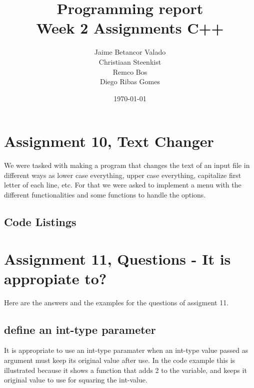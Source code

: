 \documentclass[a4paper]{article}
\begin{document}
\title{Programming report \\
       Week 2 Assignments C++
}
\date{\today}
\author{Jaime Betancor Valado \\
Christiaan Steenkist \\
Remco Bos \\
Diego Ribas Gomes
}

\maketitle

\section*{Assignment 10, Text Changer}
We were tasked with making a program that changes the text of an input file in different ways as lower case everything, upper case everything, capitalize first letter of each line, etc. For that we were asked to implement a menu with the different functionalities and some functions to handle the options.

\subsection*{Code Listings}









\section*{Assignment 11, Questions - It is appropiate to?}
Here are the answers and the examples for the questions of assigment 11.

\subsection*{define an int-type parameter}
It is appropriate to use an int-type paramater when an int-type value passed as argument must keep its original value after use. In the code example this is illustrated because it shows a function that adds 2 to the variable, and keeps it original value to use for squaring the int-value.

\end{document}
